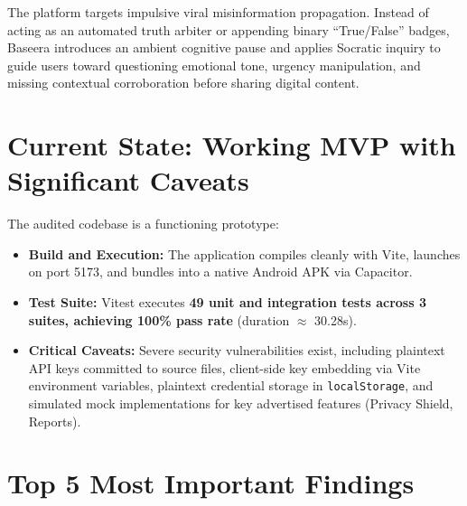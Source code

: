 \documentclass[10pt,a4paper]{report}
\begin{document}
The platform targets impulsive viral misinformation propagation. Instead of acting as an automated truth arbiter or appending binary ``True/False'' badges, Baseera introduces an ambient cognitive pause and applies Socratic inquiry to guide users toward questioning emotional tone, urgency manipulation, and missing contextual corroboration before sharing digital content.

\section{Current State: Working MVP with Significant Caveats}
The audited codebase is a functioning prototype:
\begin{itemize}[leftmargin=1.5em]
    \item \textbf{Build and Execution:} The application compiles cleanly with Vite, launches on port 5173, and bundles into a native Android APK via Capacitor.
    \item \textbf{Test Suite:} Vitest executes \textbf{49 unit and integration tests across 3 suites, achieving 100\% pass rate} (duration $\approx$ 30.28s).
    \item \textbf{Critical Caveats:} Severe security vulnerabilities exist, including plaintext API keys committed to source files, client-side key embedding via Vite environment variables, plaintext credential storage in \texttt{localStorage}, and simulated mock implementations for key advertised features (Privacy Shield, Reports).
\end{itemize}

\section{Top 5 Most Important Findings}
\end{document}
